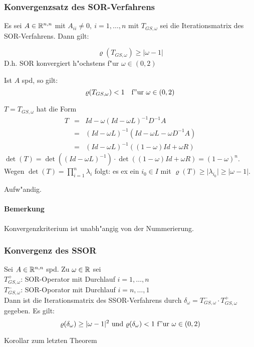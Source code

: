 \documentclass{scrartcl}
\begin{document}
\subsubsection{Konvergenzsatz des SOR-Verfahrens}

\begin{Satz}
Es sei $A \in \mathbb{R}^{n,n}$ mit $A_{ii} \neq 0, \ i=1, \ldots, n$ mit $T_{GS,\omega}$ sei die Iterationsmatrix des SOR-Verfahrens. Dann gilt:
\begin{1aufz}
\item $$\varrho(T_{GS, \omega}) \geq \vert \omega - 1 \vert$$D.h. SOR konvergiert h"ochstens f"ur $\omega \in (0,2)$
\item Ist $A$ spd, so gilt:
$$\varrho(T_{GS, \omega}) < 1 \quad \mathrm{f"ur \ } \omega \in (0,2)$$
\end{1aufz}
\end{Satz}
\begin{Bew}
\begin{1aufz}
\item $T = T_{GS, \omega}$ hat die Form
\begin{eqnarray*}
T & = & Id - \omega(Id - \omega L)^{-1}D^{-1}A \\
& = & (Id - \omega L)^{-1}(Id - \omega L - \omega D^{-1} A) \\
& = & (Id - \omega L)^{-1}((1- \omega) Id + \omega R)
\end{eqnarray*}
$\det(T) = \det((Id - \omega L)^{-1})\cdot \det((1 - \omega) Id + \omega R) = (1- \omega)^n$. \\ Wegen $\det(T) = \prod\limits_{i=1}^n \lambda_i$ folgt: es ex ein $i_0 \in I$ mit $\varrho(T) \geq \vert \lambda_{i_0} \vert \geq \vert \omega - 1\vert$.
\item Aufw"andig.
\end{1aufz}
\end{Bew}

\paragraph{Bemerkung}
Konvergenzkriterium ist unabh"angig von der Nummerierung.

\subsubsection{Konvergenz des SSOR}

\begin{Satz}
Sei $A \in \mathbb{R}^{n,n}$ spd. Zu $\omega \in \mathbb{R}$ sei \\
$T_{GS, \omega}^+$: SOR-Operator mit Durchlauf $i=1, \ldots, n$ \\
$T_{GS, \omega}^-$: SOR-Oporator mit Durchlauf $i=n, \ldots, 1$ \\
Dann ist die Iterationsmatrix des SSOR-Verfahrens durch $\delta_\omega = T_{GS, \omega}^- \cdot T_{GS, \omega}^+$ gegeben. Es gilt:
$$ \varrho(\delta_\omega) \geq \vert \omega - 1 \vert^2 \mathrm{\ und \ } \varrho(\delta_\omega) < 1 \mathrm{ \ f"ur \ } \omega \in (0,2)$$
\end{Satz}
\begin{Bew}
Korollar zum letzten Theorem
\end{Bew}
\end{document}
